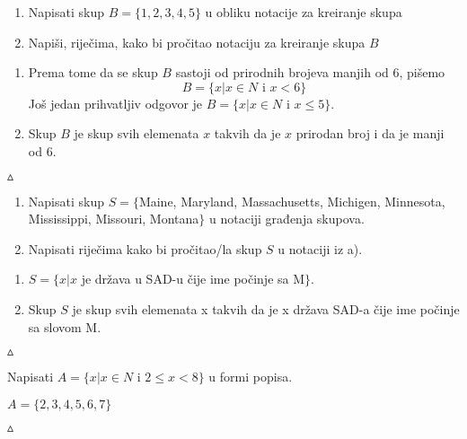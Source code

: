 \documentclass[a4paper,14pt,svgnames]{article}
\newcounter{counter}
\newcommand{\examplecounter}{\textbf{\refstepcounter{counter}PRIMJER \thecounter}}
\newcommand{\example}[3]{\begin{tcolorbox}[title=\large \examplecounter \hfill\small\textbf{"#1"}]
#2
\begin{tcolorbox}[title=\small \textbf{RJEŠENJE},colback=white]
\begin{center}
#3

\vspace{0.5em}\hfill $\vartriangle$
\end{center}
\end{tcolorbox}
\end{tcolorbox}}
\begin{document}
\example{Korištenje notacije za kreiranje skupova}{\begin{enumerate}[label=\alph*),leftmargin=0.5cm]
\item Napisati skup $B=\{1, 2, 3, 4, 5\}$ u obliku notacije za kreiranje skupa
\item Napiši, riječima, kako bi pročitao notaciju za kreiranje skupa $B$
\end{enumerate}}{\begin{enumerate}[label=\alph*),leftmargin=0.5cm]
\item Prema tome da se skup $B$ sastoji od prirodnih brojeva manjih od 6, pišemo $$B=\{x|x\in N\text { i } x< 6\}$$ Još jedan prihvatljiv odgovor je $B=\{x|x\in N$ i $x\leqslant 5\}$.
\item Skup $B$ je skup svih elemenata $x$ takvih da je $x$ prirodan broj i da je manji od 6.
\end{enumerate}}

\example{Forma popisa u notaciji građenja skupova}{\begin{enumerate}[label=\alph*),leftmargin=0.5cm]
\item Napisati skup $S = \{$Maine, Maryland, Massachusetts, Michigen, Minnesota, Mississippi, Missouri, Montana$\}$ u notaciji građenja skupova.
\item Napisati riječima kako bi pročitao/la skup $S$ u notaciji iz a).
\end{enumerate}}{\begin{enumerate}[label=\alph*),leftmargin=0.5cm]
\item $S=\{x|x$ je država u SAD-u čije ime počinje sa M$\}$.
\item Skup $S$ je skup svih elemenata x takvih da je x država SAD-a čije ime počinje sa slovom M.
\end{enumerate}}

\example{Notacija građenja skupova u formi popisa}{Napisati $A=\{x|x\in N$ i $2\leqslant x<8\}$ u formi popisa.}{$A=\{2, 3, 4, 5, 6, 7\}$}
\end{document}
